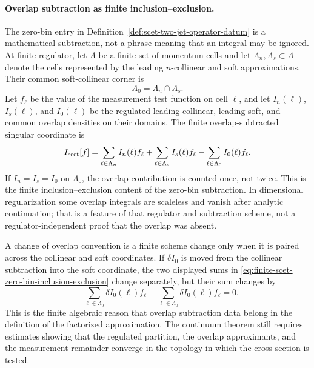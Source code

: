 \paragraph{Overlap subtraction as finite inclusion--exclusion.}
The zero-bin entry in Definition~\ref{def:scet-two-jet-operator-datum} is a
mathematical subtraction, not a phrase meaning that an integral may be ignored.
At finite regulator, let \(\Lambda\) be a finite set of momentum cells and let
\(\Lambda_n,\Lambda_s\subset\Lambda\) denote the cells represented by the
leading \(n\)-collinear and soft approximations.  Their common soft-collinear
corner is
\[
  \Lambda_0=\Lambda_n\cap\Lambda_s .
\]
Let \(f_\ell\) be the value of the measurement test function on cell
\(\ell\), and let \(I_n(\ell)\), \(I_s(\ell)\), and \(I_0(\ell)\) be the
regulated leading collinear, leading soft, and common overlap densities on
their domains.  The finite overlap-subtracted singular coordinate is
\begin{equation}
  I_{\rm scet}[f]
  =
  \sum_{\ell\in\Lambda_n} I_n(\ell)f_\ell
  +
  \sum_{\ell\in\Lambda_s} I_s(\ell)f_\ell
  -
  \sum_{\ell\in\Lambda_0} I_0(\ell)f_\ell .
  \label{eq:finite-scet-zero-bin-inclusion-exclusion}
\end{equation}
If \(I_n=I_s=I_0\) on \(\Lambda_0\), the overlap contribution is counted once,
not twice.  This is the finite inclusion--exclusion content of the zero-bin
subtraction.  In dimensional regularization some overlap integrals are
scaleless and vanish after analytic continuation; that is a feature of that
regulator and subtraction scheme, not a regulator-independent proof that the
overlap was absent.

A change of overlap convention is a finite scheme change only when it is
paired across the collinear and soft coordinates.  If
\(\delta I_0\) is moved from the collinear subtraction into the soft
coordinate, the two displayed sums in
\eqref{eq:finite-scet-zero-bin-inclusion-exclusion} change separately, but
their sum changes by
\[
  -\sum_{\ell\in\Lambda_0}\delta I_0(\ell)f_\ell
  +
  \sum_{\ell\in\Lambda_0}\delta I_0(\ell)f_\ell
  =
  0 .
\]
This is the finite algebraic reason that overlap subtraction data belong in
the definition of the factorized approximation.  The continuum theorem still
requires estimates showing that the regulated partition, the overlap
approximants, and the measurement remainder converge in the topology in which
the cross section is tested.


